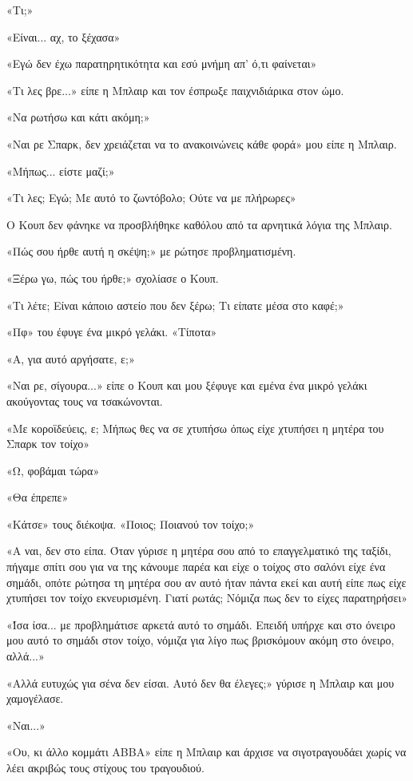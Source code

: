 \documentclass[12pt,twoside, openany]{book}
\begin{document}
«Τι;»

«Είναι... αχ, το ξέχασα»

«Εγώ δεν έχω παρατηρητικότητα και εσύ μνήμη απ’ ό,τι φαίνεται»

«Τι λες βρε...» είπε η Μπλαιρ και τον έσπρωξε παιχνιδιάρικα στον ώμο.

«Να ρωτήσω και κάτι ακόμη;»

«Ναι ρε Σπαρκ, δεν χρειάζεται να το ανακοινώνεις κάθε φορά» μου είπε η Μπλαιρ.

«Μήπως... είστε μαζί;»

«Τι λες; Εγώ; Με αυτό το ζωντόβολο; Ούτε να με πλήρωρες»

Ο Κουπ δεν φάνηκε να προσβλήθηκε καθόλου από τα αρνητικά λόγια της Μπλαιρ.

«Πώς σου ήρθε αυτή η σκέψη;» με ρώτησε προβληματισμένη.

«Ξέρω γω, πώς του ήρθε;» σχολίασε ο Κουπ.

«Τι λέτε; Είναι κάποιο αστείο που δεν ξέρω; Τι είπατε μέσα στο καφέ;»

«Πφ» του έφυγε ένα μικρό γελάκι. «Τίποτα»

«Α, για αυτό αργήσατε, ε;»

«Ναι ρε, σίγουρα...» είπε ο Κουπ και μου ξέφυγε και εμένα ένα μικρό γελάκι ακούγοντας τους να τσακώνονται.

«Με κοροϊδεύεις, ε; Μήπως θες να σε χτυπήσω όπως είχε χτυπήσει η μητέρα του Σπαρκ τον τοίχο»

«Ω, φοβάμαι τώρα»

«Θα έπρεπε»

«Κάτσε» τους διέκοψα. «Ποιος; Ποιανού τον τοίχο;»

«Α ναι, δεν στο είπα. Όταν γύρισε η μητέρα σου από το επαγγελματικό της ταξίδι, πήγαμε σπίτι σου για να της κάνουμε παρέα και είχε ο τοίχος στο σαλόνι είχε ένα σημάδι, οπότε ρώτησα τη μητέρα σου αν αυτό ήταν πάντα εκεί και αυτή είπε πως είχε χτυπήσει τον τοίχο εκνευρισμένη. Γιατί ρωτάς; Νόμιζα πως δεν το είχες παρατηρήσει»

«Ίσα ίσα... με προβλημάτισε αρκετά αυτό το σημάδι. Επειδή υπήρχε και στο όνειρο μου αυτό το σημάδι στον τοίχο, νόμιζα για λίγο πως βρισκόμουν ακόμη στο όνειρο, αλλά...»

«Αλλά ευτυχώς για σένα δεν είσαι. Αυτό δεν θα έλεγες;» γύρισε η Μπλαιρ και μου χαμογέλασε.

«Ναι...»

«Ου, κι άλλο κομμάτι ABBA» είπε η Μπλαιρ και άρχισε να σιγοτραγουδάει χωρίς να λέει ακριβώς τους στίχους του τραγουδιού.
\end{document}
